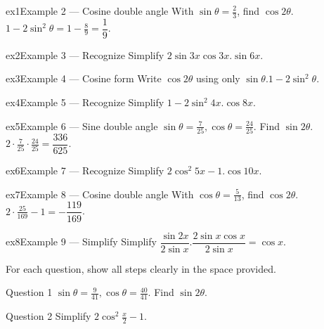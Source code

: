 \documentclass[11pt]{article}
\begin{document}
\begin{example}{ex1}{Example 2 --- Cosine double angle}
With $\sin\theta=\tfrac23$, find $\cos2\theta$.\soln $1-2\sin^2\theta=1-\tfrac89=\dfrac19$.
\end{example}

\begin{example}{ex2}{Example 3 --- Recognize}
Simplify $2\sin 3x\cos 3x$.\soln $\sin6x$.
\end{example}

\begin{example}{ex3}{Example 4 --- Cosine form}
Write $\cos2\theta$ using only $\sin\theta$.\soln $1-2\sin^2\theta$.
\end{example}

\begin{example}{ex4}{Example 5 --- Recognize}
Simplify $1-2\sin^2 4x$.\soln $\cos8x$.
\end{example}

\begin{example}{ex5}{Example 6 --- Sine double angle}
$\sin\theta=\tfrac7{25},\cos\theta=\tfrac{24}{25}$. Find $\sin2\theta$.\soln $2\cdot\tfrac7{25}\cdot\tfrac{24}{25}=\dfrac{336}{625}$.
\end{example}

\begin{example}{ex6}{Example 7 --- Recognize}
Simplify $2\cos^2 5x-1$.\soln $\cos10x$.
\end{example}

\begin{example}{ex7}{Example 8 --- Cosine double angle}
With $\cos\theta=\tfrac5{13}$, find $\cos2\theta$.\soln $2\cdot\tfrac{25}{169}-1=-\dfrac{119}{169}$.
\end{example}

\begin{example}{ex8}{Example 9 --- Simplify}
Simplify $\dfrac{\sin2x}{2\sin x}$.\soln $\dfrac{2\sin x\cos x}{2\sin x}=\cos x$.
\end{example}

\clearpage
{}
For each question, show all steps clearly in the space provided.

\begin{qbox}{Question 1}
$\sin\theta=\tfrac9{41},\cos\theta=\tfrac{40}{41}$. Find $\sin2\theta$.\workspace{2.4cm}
\end{qbox}

\begin{qbox}{Question 2}
Simplify $2\cos^2\tfrac{x}{2}-1$.\workspace{2.4cm}
\end{qbox}
\end{document}
